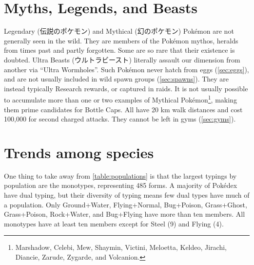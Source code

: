 \section{Myths, Legends, and Beasts}
\label{sec:myths}
Legendary (\textjapanese{伝説のポケモン}) and Mythical (\textjapanese{幻のポケモン}) Pokémon
 are not generally seen in the wild.
They are members of the Pokémon mythos, heralds from times past and partly forgotten.
Some are so rare that their existence is doubted.
Ultra Beasts (\textjapanese{ウルトラビースト}) literally assault our dimension from
  another via ``Ultra Wormholes''.
Such Pokémon never hatch from eggs (\autoref{sec:eggs}), and are not usually included in wild spawn groups (\autoref{sec:spawns}).
They are instead typically Research rewards, or captured in raids.
It is not usually possible to accumulate more than one or two examples of Mythical
  Pokémon\footnote{Marshadow, Celebi, Mew, Shaymin, Victini, Meloetta, Keldeo,
  Jirachi, Diancie, Zarude, Zygarde, and Volcanion.}, making them prime
  candidates for Bottle Caps.
All have 20 km walk distances and cost 100,000 for second charged attacks.
They cannot be left in gyms (\autoref{sec:gyms}).

\section{Trends among species}
One thing to take away from \autoref{table:populations} is that the largest
  typings by population are the monotypes, representing 485 forms.
A majority of Pokédex have dual typing, but their diversity of typing means few dual types have much of a population.
Only Ground+Water, Flying+Normal, Bug+Poison, Grass+Ghost, Grass+Poison, Rock+Water, and Bug+Flying
  have more than ten members.
All monotypes have at least ten members except for Steel (9) and Flying (4).


